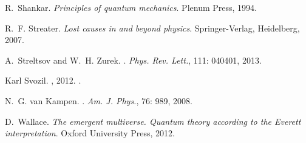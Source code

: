 \documentclass[a4paper,12pt]{article}
\begin{document}
\begin{thebibliography}{63}
R.~Shankar.
\newblock \emph{{Principles of quantum mechanics}}.
\newblock Plenum Press, 1994.

R.~F. Streater.
\newblock \emph{{Lost causes in and beyond physics}}.
\newblock Springer-Verlag, Heidelberg, 2007.

A.~Streltsov and W.~H. Zurek.
.
\newblock \emph{Phys. Rev. Lett.}, 111: 040401, 2013.

Karl Svozil.
, 2012.
.

N.~G. van Kampen.
.
\newblock \emph{Am. J. Phys.}, 76: 989, 2008.

D.~Wallace.
\newblock \emph{{The emergent multiverse. Quantum theory according to the
  Everett interpretation}}.
\newblock Oxford University Press, 2012.

\end{thebibliography}
\end{document}
